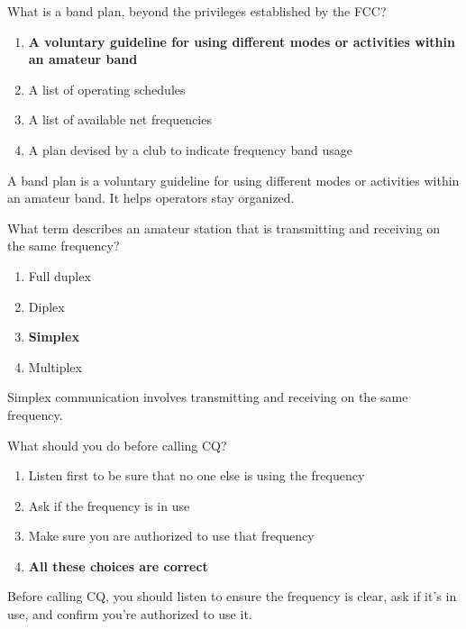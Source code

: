 \begin{tcolorbox}[colback=gray!10!white,colframe=black!75!black,title={T2A10}]
What is a band plan, beyond the privileges established by the FCC?
\begin{enumerate}[label=\Alph*),noitemsep]
    \item \textbf{A voluntary guideline for using different modes or activities within an amateur band}
    \item A list of operating schedules
    \item A list of available net frequencies
    \item A plan devised by a club to indicate frequency band usage
\end{enumerate}
\end{tcolorbox}
A band plan is a voluntary guideline for using different modes or activities within an amateur band. It helps operators stay organized.

\begin{tcolorbox}[colback=gray!10!white,colframe=black!75!black,title={T2A11}]
What term describes an amateur station that is transmitting and receiving on the same frequency?
\begin{enumerate}[label=\Alph*),noitemsep]
    \item Full duplex
    \item Diplex
    \item \textbf{Simplex}
    \item Multiplex
\end{enumerate}
\end{tcolorbox}
Simplex communication involves transmitting and receiving on the same frequency.

\begin{tcolorbox}[colback=gray!10!white,colframe=black!75!black,title={T2A12}]
What should you do before calling CQ?
\begin{enumerate}[label=\Alph*),noitemsep]
    \item Listen first to be sure that no one else is using the frequency
    \item Ask if the frequency is in use
    \item Make sure you are authorized to use that frequency
    \item \textbf{All these choices are correct}
\end{enumerate}
\end{tcolorbox}
Before calling CQ, you should listen to ensure the frequency is clear, ask if it’s in use, and confirm you’re authorized to use it.
